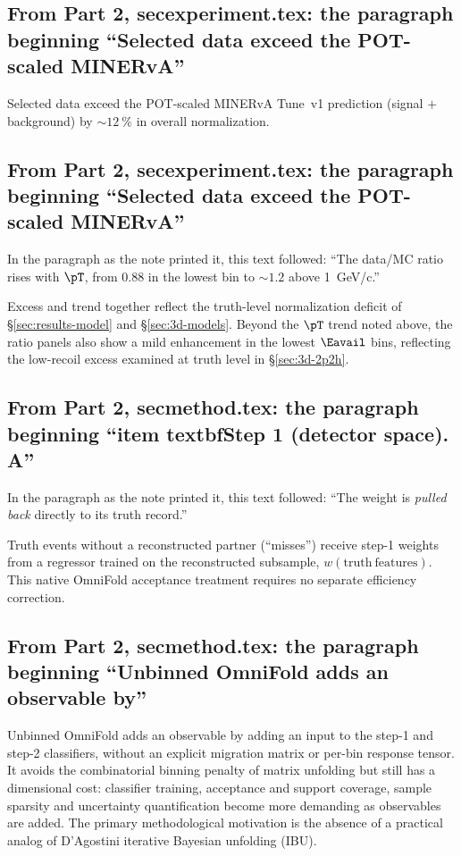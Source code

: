 \subsection{From Part 2, secexperiment.tex: the paragraph beginning ``Selected data exceed the POT-scaled MINERvA''}
Selected data exceed the POT-scaled MINERvA Tune~v1 prediction (signal $+$ background) by $\sim\SI{12}{\percent}$ in overall normalization.

\subsection{From Part 2, secexperiment.tex: the paragraph beginning ``Selected data exceed the POT-scaled MINERvA''}
In the paragraph as the note printed it, this text followed: ``The data/MC ratio rises with $\pT$, from $0.88$ in the lowest bin to $\sim1.2$ above \SI{1}{GeV/c}.''\par
Excess and trend together reflect the truth-level normalization deficit of \S\ref{sec:results-model} and \S\ref{sec:3d-models}. Beyond the $\pT$ trend noted above, the ratio panels also show a mild enhancement in the lowest $\Eavail$ bins, reflecting the low-recoil excess examined at truth level in \S\ref{sec:3d-2p2h}.

\subsection{From Part 2, secmethod.tex: the paragraph beginning ``item textbfStep 1 (detector space). A''}
In the paragraph as the note printed it, this text followed: ``The weight is \emph{pulled back} directly to its truth record.''\par
Truth events without a reconstructed partner (``misses'') receive step-1 weights from a regressor trained on the reconstructed subsample, $w(\mathrm{truth\ features})$. This native OmniFold acceptance treatment requires no separate efficiency correction.

\subsection{From Part 2, secmethod.tex: the paragraph beginning ``Unbinned OmniFold adds an observable by''}
Unbinned OmniFold adds an observable by adding an input to the step-1 and step-2 classifiers, without an explicit migration matrix or per-bin response tensor. It avoids the combinatorial binning penalty of matrix unfolding but still has a dimensional cost: classifier training, acceptance and support coverage, sample sparsity and uncertainty quantification become more demanding as observables are added. The primary methodological motivation is the absence of a practical analog of D'Agostini iterative Bayesian unfolding (IBU).

